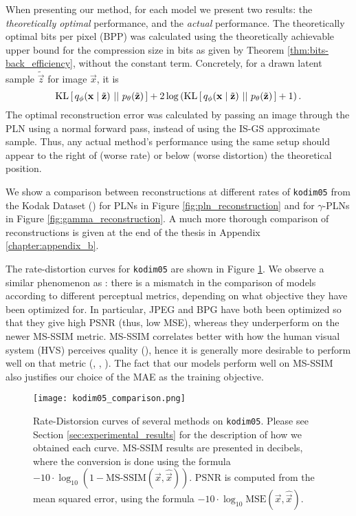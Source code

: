 \par
When presenting our method, for each model we present two results: the \textit{theoretically
optimal} performance, and the \textit{actual} performance. The theoretically
optimal bits per pixel (BPP) was calculated using the theoretically
achievable upper bound for the compression size in bits as given by
Theorem \ref{thm:bits-back_efficiency}, without the constant term. Concretely,
for a drawn latent sample $\tilde{\vec{z}}$ for image $\vec{x}$, it is 
\[
  \mathrm{KL}\left[\,q_\phi(\mathbf{x} \mid \tilde{\mathbf{z}})\,\,||\,\,p_\theta(\tilde{\mathbf{z}})\,\right]
  + 2 \log \left( \mathrm{KL}\left[\,q_\phi(\mathbf{x}
      \mid \tilde{\mathbf{z}})\,\,||\,\,p_\theta(\tilde{\mathbf{z}})\,\right] + 1 \right).
\]
The optimal reconstruction error was calculated by passing an image through the
PLN using a normal forward pass, instead of using the IS-GS approximate sample. Thus, any
actual method's performance using the same setup should appear to the right of
(worse rate) or below (worse distortion) the theoretical position.


\par
We show a comparison between reconstructions at different rates of
\texttt{kodim05} from the Kodak Dataset (\cite{kodakdataset}) for PLNs in Figure
\ref{fig:pln_reconstruction} and for $\gamma$-PLNs in Figure
\ref{fig:gamma_reconstruction}. A much more thorough comparison of
reconstructions is given at the end of the thesis in Appendix \ref{chapter:appendix_b}.
\par
The rate-distortion curves for \texttt{kodim05} are shown in Figure
\ref{fig:kodim05_comp}. We observe a similar phenomenon as
\cite{balle2018variational}: there is a mismatch in the comparison
of models according to different perceptual metrics, depending on what objective
they have been optimized for. In particular, JPEG and BPG have both been
optimized so that they give high PSNR (thus, low MSE), whereas they underperform
on the newer MS-SSIM metric. MS-SSIM correlates better with how
the human visual system (HVS) perceives quality (\cite{msssim}),
hence it is generally more desirable to perform well on that metric
(\cite{toderici2017full}, \cite{rippel2017real}, \cite{balle2018variational}).
The fact that our models perform well on MS-SSIM also justifies our choice of
the MAE as the training objective.
\begin{figure}
  \centering
  \texttt{[image: kodim05\_comparison.png]}
  \caption[Rate-Distorsion curves of several methods on \texttt{kodim05}]
  {Rate-Distorsion curves of several methods on \texttt{kodim05}. Please see
    Section \ref{sec:experimental_results} for the description of how we
    obtained each curve. MS-SSIM results are presented in
    decibels, where the conversion is done using the formula $-10 \cdot
    \log_{10}\left( 1 - \text{MS-SSIM}(\vec{x}, \hat{\vec{x}}) \right)$.
    PSNR is computed from the mean squared error, using the formula 
    $-10 \cdot \log_{10}\text{MSE}(\vec{x}, \hat{\vec{x}})$.}
  \label{fig:kodim05_comp}
\end{figure}

